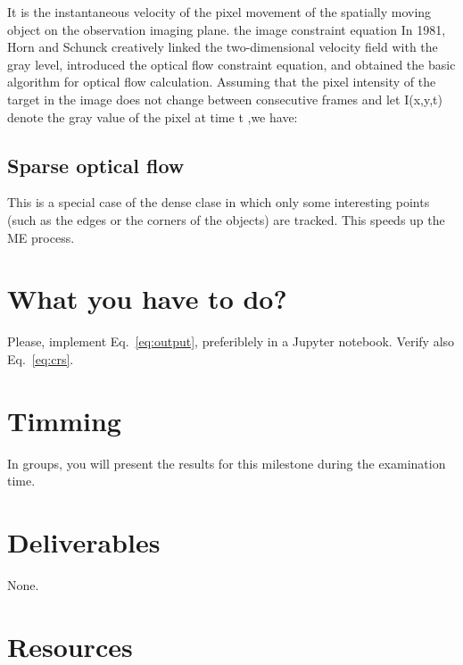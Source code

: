 It is the instantaneous velocity of the pixel movement of the spatially moving object on the observation imaging plane. the image constraint equation
%
In 1981, Horn and Schunck creatively linked the two-dimensional velocity field with the gray level, introduced the optical flow constraint equation, and obtained the basic algorithm for optical flow calculation.
%
Assuming that the pixel intensity of the target in the image does not change between consecutive frames and let I(x,y,t) denote the gray value of the pixel at time t ,we have:

\subsection{Sparse optical flow}
This is a special case of the dense clase in which only some
interesting points (such as the edges or the corners of the objects)
are tracked. This speeds up the ME process.

\section{What you have to do?}

Please, implement Eq.~\ref{eq:output}, preferiblely in a Jupyter
notebook. Verify also Eq.~\ref{eq:crs}.

\section{Timming}

In groups, you will present the results for this milestone during the
examination time.

\section{Deliverables}

None.

\section{Resources}


